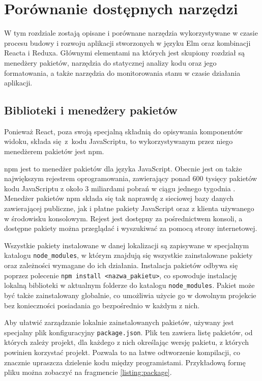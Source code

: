 \chapter{Porównanie dostępnych narzędzi}\label{chap:tools}
W tym rozdziale zostają opisane i porównane narzędzia wykorzystywane w czasie procesu budowy i rozwoju aplikacji stworzonych w języku Elm oraz kombinacji Reacta i Reduxa. Głównymi elementami na których jest skupiony rozdział są menedżery pakietów, narzędzia do statycznej analizy kodu oraz jego formatowania, a także narzędzia do monitorowania stanu w czasie działania aplikacji.

\section{Biblioteki i menedżery pakietów}
Ponieważ React, poza swoją specjalną składnią do opisywania komponentów widoku, składa się z~kodu JavaScriptu, to wykorzystywanym przez niego menedżerem pakietów jest npm. 

npm jest to menedżer pakietów dla języka JavaScript. Obecnie jest on także największym rejestrem oprogramowania, zawierający ponad 600 tysięcy pakietów kodu JavaScriptu z około 3 miliardami pobrań w ciągu jednego tygodnia \cite{whatIsNpm}. Menedżer pakietów npm składa się tak naprawdę z sieciowej bazy danych zawierającej publiczne, jak i płatne pakiety JavaScript oraz z klienta używanego w środowisku konsolowym. Rejest jest dostępny za pośrednictwem konsoli, a dostępne pakiety można przeglądać i wyszukiwać za pomocą strony internetowej. 

Wszystkie pakiety instalowane w danej lokalizacji są zapisywane w specjalnym katalogu \lstinline{node_modules}, w którym znajdują się wszystkie zainstalowane pakiety oraz zależności wymagane do ich działania. Instalacja pakietów odbywa się poprzez polecenie \lstinline{npm install <nazwa_pakietu>}, co spowoduje instalację lokalną biblioteki w aktualnym folderze do katalogu \lstinline{node_modules}. Pakiet może być także zainstalowany globalnie, co umożliwia użycie go w dowolnym projekcie bez konieczności posiadania go bezpośrednio w każdym z nich.

Aby ułatwić zarządzanie lokalnie zainstalowanych pakietów, używany jest specjalny plik konfiguracyjny \lstinline{package.json}. Plik ten zawiera listę pakietów, od których zależy projekt, dla każdego z nich określając wersję pakietu, z których powinien korzystać projekt. Pozwala to na łatwe odtworzenie kompilacji, co znacznie upraszcza dzielenie kodu między programistami. Przykładową formę pliku można zobaczyć na fragmencie \ref{listing:package}.


